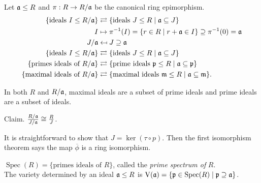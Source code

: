 \begin{fact}\label{1.15}
    Let $\mathfrak{a} \leq R$ and $\pi: R \to R/\mathfrak{a}$ be the canonical ring epimorphism. 
    \begin{align*}
        \{\text{ideals }I \leq R/\mathfrak{a}\} &\rightleftarrows \{\text{ideals }J \leq R \mid \mathfrak{a} \subseteq J\} \\
        I &\mapsto \pi^{-1}(I) = \{r \in R \mid r + \mathfrak{a} \in I\} \supseteq \pi^{-1}(0) = \mathfrak{a}  \\
        J/\mathfrak{a} &\mapsfrom J \supseteq \mathfrak{a} \\
    \{\text{ideals } I \leq R/\mathfrak{a}\} &\rightleftarrows \{\text{ideals }J \leq R \mid \mathfrak{a} \subseteq J\} \\
        \{\text{primes ideals of } R/\mathfrak{a}\} &\rightleftarrows \{\text{prime ideals }\mathfrak{p} \leq R \mid \mathfrak{a} \subseteq \mathfrak{p}\} \\
        \{\text{maximal ideals of } R/\mathfrak{a}\} &\rightleftarrows \{\text{maximal ideals }\mathfrak{m} \leq R \mid \mathfrak{a} \subseteq \mathfrak{m}\}.
    \end{align*}
    \par
    In both $R$ and $R/\mathfrak{a}$, maximal ideals are a subset of prime ideals and prime ideals are a subset of ideals. \par
    Claim. $\frac{R/\mathfrak{a}}{J/\mathfrak{a}} \cong \frac{R}{J}$.
    \begin{center}
    \end{center}
    \par 
    It is straightforward to show that $J = \ker(\tau \circ p)$. Then the first isomorphism theorem says the map $\overbar \phi$ is a ring isomorphism. 
\end{fact}

\begin{notation*}
    $\operatorname{Spec}(R) = \{\text{primes ideals of $R$}\}$, called the \emph{prime spectrum of} $R$. \\
    The variety determined by an ideal $\mathfrak{a} \leq R$ is $\operatorname{V}(\mathfrak{a}) = \{\mathfrak{p} \in \operatorname{Spec}(R) \mid \mathfrak{p} \supseteq \mathfrak{a}\}$.
\end{notation*}


